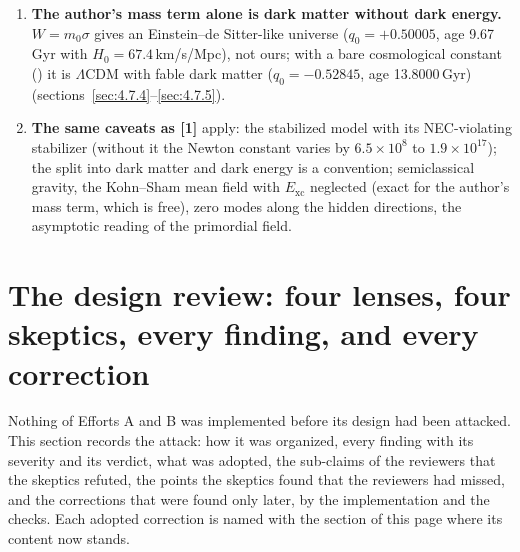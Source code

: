 \begin{enumerate}
        ( $\nu=0.236$, 30\,eV), $[-0.611,\,+3.59\times10^{-6}]$ (100\,eV), $[-27.6,\,+0.333]$ and
        $[-27.7,\,+0.333]$ ( $\nu=0.5$), $[-21.8,\,+0.333]$ (), $[-47.1,\,+0.333]$
        (), and $[-0.364,\,-3.89\times10^{-5}]$ (Part~VIII's case) (). This late
        variation is the same exchange that makes the inferred dark energy vary in [1], and it carries all of
        [1]'s caveats (adiabatic instability, the sea energy, the viability window $\nu<0.2788$).
  \item \textbf{The author's mass term alone is dark matter without dark energy.} $W=m_0\sigma$ gives an
        Einstein--de Sitter-like universe ($q_0=+0.50005$, age 9.67\,Gyr with $H_0=67.4$\,km/s/Mpc), not ours;
        with a bare cosmological constant () it is $\Lambda$CDM with fable dark matter
        ($q_0=-0.52845$, age 13.8000\,Gyr) (sections~\ref{sec:4.7.4}--\ref{sec:4.7.5}).
  \item \textbf{The same caveats as [1]} apply: the stabilized model with its NEC-violating stabilizer (without
        it the Newton constant varies by $6.5\times10^{8}$ to $1.9\times10^{17}$); the split into dark matter and
        dark energy is a convention; semiclassical gravity, the Kohn--Sham mean field with $E_{\mathrm{xc}}$
        neglected (exact for the author's mass term, which is free), zero modes along the hidden directions,
        the asymptotic reading of the primordial field.
\end{enumerate}

\section{The design review: four lenses, four skeptics, every finding, and every correction}
\label{sec:5}

Nothing of Efforts A and B was implemented before its design had been attacked. This section records the attack: how it was organized, every finding with its severity and its verdict, what was adopted, the sub-claims of the reviewers that the skeptics refuted, the points the skeptics found that the reviewers had missed, and the corrections that were found only later, by the implementation and the checks. Each adopted correction is named with the section of this page where its content now stands.

